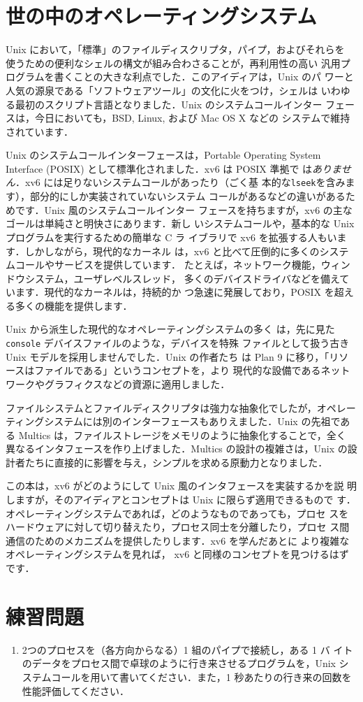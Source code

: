 \section{世の中のオペレーティングシステム}

Unix において，「標準」のファイルディスクリプタ，パイプ，およびそれらを
使うための便利なシェルの構文が組み合わさることが，再利用性の高い
汎用プログラムを書くことの大きな利点でした．このアイディアは，Unix のパ
ワーと人気の源泉である「ソフトウェアツール」の文化に火をつけ，シェルは
いわゆる最初のスクリプト言語となりました．Unix のシステムコールインター
フェースは，今日においても，BSD, Linux, および Mac OS X などの
システムで維持されています．


Unix のシステムコールインターフェースは，Portable Operating System
Interface (POSIX) として標準化されました．xv6 は POSIX 準拠で
は\textit{ありません}．xv6 には足りないシステムコールがあったり（ごく基
本的な\lstinline{lseek}を含みます），部分的にしか実装されていないシステム
コールがあるなどの違いがあるためです．Unix 風のシステムコールインター
フェースを持ちますが，xv6 の主なゴールは単純さと明快さにあります．新し
いシステムコールや，基本的な Unix プログラムを実行するための簡単な C ラ
イブラリで xv6 を拡張する人もいます．しかしながら，現代的なカーネル
は，xv6 と比べて圧倒的に多くのシステムコールやサービスを提供しています．
たとえば，ネットワーク機能，ウィンドウシステム，ユーザレベルスレッド，
多くのデバイスドライバなどを備えています．現代的なカーネルは，持続的か
つ急速に発展しており，POSIX を超える多くの機能を提供します．


Unix から派生した現代的なオペレーティングシステムの多く
は，先に見た \lstinline{console} デバイスファイルのような，デバイスを特殊
ファイルとして扱う古き Unix モデルを採用しませんでした．Unix の作者たち
は Plan 9 に移り，「リソースはファイルである」というコンセプトを，より
現代的な設備であるネットワークやグラフィクスなどの資源に適用しました．


ファイルシステムとファイルディスクリプタは強力な抽象化でしたが，オペレー
ティングシステムには別のインターフェースもありえました．Unix の先祖であ
る Multics は，ファイルストレージをメモリのように抽象化することで，全く
異なるインタフェースを作り上げました．Multics の設計の複雑さは，Unix
の設計者たちに直接的に影響を与え，シンプルを求める原動力となりました．


この本は，xv6 がどのようにして Unix 風のインタフェースを実装するかを説
明しますが，そのアイディアとコンセプトは Unix に限らず適用できるもので
す．オペレーティングシステムであれば，どのようなものであっても，プロセ
スをハードウェアに対して切り替えたり，プロセス同士を分離したり，プロセ
ス間通信のためのメカニズムを提供したりします．xv6 を学んだあとに
より複雑なオペレーティングシステムを見れば，
xv6 と同様のコンセプトを見つけるはずです．

\section{練習問題}

\begin{enumerate}

\item 2つのプロセスを（各方向からなる）1 組のパイプで接続し，ある 1 バ
  イトのデータをプロセス間で卓球のように行き来させるプログラムを，Unix
  システムコールを用いて書いてください．また，1 秒あたりの行き来の回数を
  性能評価してください．

\end{enumerate}
